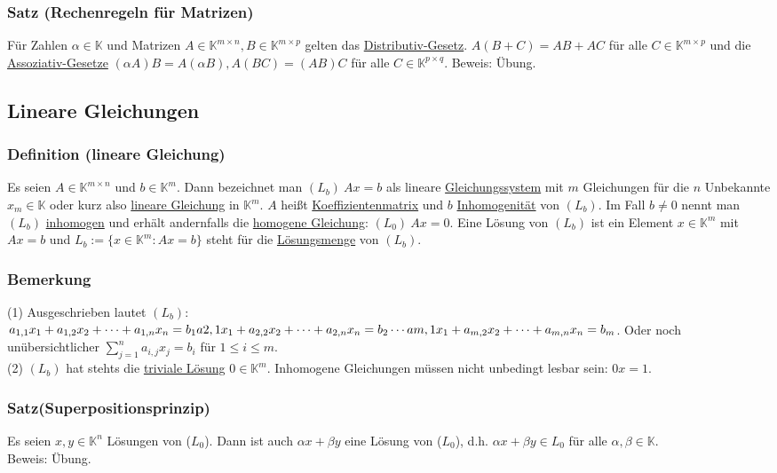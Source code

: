 \subsubsection{Satz (Rechenregeln für Matrizen)}
Für Zahlen $\alpha \in \mathbb{K}$ und Matrizen $A\in \mathbb{K}^{m\times n},B\in\mathbb{K}^{m\times p}$ gelten das \underline{Distributiv-Gesetz}.  $A(B+C)=AB+AC$ für alle $C\in \mathbb{K}^{m\times p}$ und die \underline{Assoziativ-Gesetze} $(\alpha A)B=A(\alpha B), A(BC)=(AB)C$ für alle $C\in \mathbb{K}^{p\times q}$.
Beweis: Übung.
\subsection{Lineare Gleichungen}
\subsubsection{Definition (lineare Gleichung)}
Es seien $A\in \mathbb{K}^{m\times n}$ und $b\in \mathbb{K}^{m}$.  Dann bezeichnet man $(L_b)\ Ax=b$ als lineare \underline{Gleichungssystem} mit $m$ Gleichungen für die $n$ Unbekannte $x_m\in \mathbb{K}$ oder kurz also \underline{lineare Gleichung} in $\mathbb{K}^m$.  $A$ heißt \underline{Koeffizientenmatrix} und $b$ \underline{Inhomogenität} von $(L_b)$.  Im Fall $b\not= 0$ nennt man $(L_b)$ \underline{inhomogen} und erhält andernfalls die \underline{homogene Gleichung}: $(L_0)\ Ax=0$.  Eine Lösung von $(L_b)$ ist ein Element $x\in \mathbb{K}^m$ mit $Ax=b$ und $L_b:=\{ x\in \mathbb{K}^m:Ax=b\}$ steht für die \underline{Lösungsmenge} von $(L_b)$.
\subsubsection{Bemerkung}
(1) Ausgeschrieben lautet $(L_b)$: $a_{1,1}x_1+a_{1,2}x_2+\cdots +a_{1,n}x_n = b_1\\a{2,1}x_1+a_{2,2}x_2+\cdots +a_{2,n}x_n = b_2\\\cdots \\a{m,1}x_1+a_{m,2}x_2+\cdots +a_{m,n}x_n=b_m$.  Oder noch unübersichtlicher $\sum^n_{j=1} a_{i,j}x_j = b_i$ für $1\leq i\leq m$.\\
(2) $(L_b)$ hat stehts die \underline{triviale Lösung} $0\in \mathbb{K}^m$.  Inhomogene Gleichungen müssen nicht unbedingt lesbar sein: $0x=1$.\\
\subsubsection{Satz(Superpositionsprinzip)}
Es seien $x,y \in \mathbb{K}^n$ Lösungen von ($L_0$).  Dann ist auch $\alpha x+\beta y$ eine Lösung von ($L_0$), d.h. $\alpha x+\beta y\in L_0$ für alle $\alpha ,\beta \in \mathbb{K}$. \\
Beweis: Übung.
